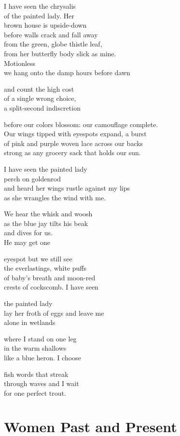 \documentclass[twoside,10pt]{book}
\begin{document}
I have seen the chrysalis\\
of the painted lady. Her\\
brown house is upside-down\\
before walls crack and fall away\\
from the green, globe thistle leaf,\\
from her butterfly body slick as mine.\\
Motionless\\
we hang onto the damp hours before dawn

and count the high cost\\
of a single wrong choice,\\
a split-second indiscretion

before our colors blossom: our camouflage complete.\\
Our wings tipped with eyespots expand, a burst\\
of pink and purple woven lace across our backs\\
strong as any grocery sack that holds our sun.

I have seen the painted lady\\
perch on goldenrod\\
and heard her wings rustle against my lips\\
as she wrangles the wind with me.

We hear the whisk and woosh\\
as the blue jay tilts his beak\\
and dives for us.\\
He may get one

eyespot but we still see\\
the everlastings, white puffs\\
of baby's breath and moon-red\\
crests of cockscomb. I have seen

the painted lady\\
lay her froth of eggs and leave me\\
alone in wetlands

where I stand on one leg\\
in the warm shallows\\
like a blue heron. I choose

fish words that streak\\
through waves and I wait\\
for one perfect trout.


\clearpage
\section{Women Past and Present}
\end{document}
